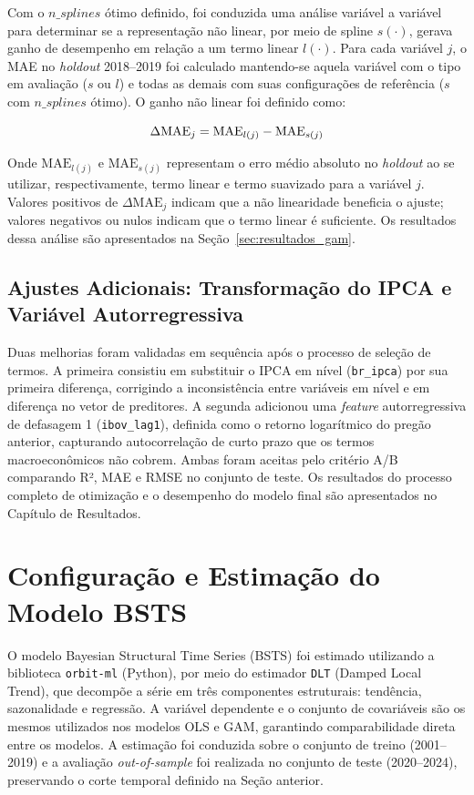 \documentclass[	12pt, Times, openright, oneside, a4paper, english, brazil]{abntex2}
\begin{document}
Com o $n\_splines$ ótimo definido, foi conduzida uma análise variável a variável para determinar se a representação não linear, por meio de spline $s(\cdot)$, gerava ganho de desempenho em relação a um termo linear $l(\cdot)$. Para cada variável $j$, o MAE no \textit{holdout} 2018--2019 foi calculado mantendo-se aquela variável com o tipo em avaliação ($s$ ou $l$) e todas as demais com suas configurações de referência ($s$ com $n\_splines$ ótimo). O ganho não linear foi definido como:

\begin{equation}\hfill
\Delta\text{MAE}_j = \text{MAE}_{l(j)} - \text{MAE}_{s(j)}
\label{eq:ganho_nao_linear}
\end{equation}

Onde $\text{MAE}_{l(j)}$ e $\text{MAE}_{s(j)}$ representam o erro médio absoluto no \textit{holdout} ao se utilizar, respectivamente, termo linear e termo suavizado para a variável $j$. Valores positivos de $\Delta\text{MAE}_j$ indicam que a não linearidade beneficia o ajuste; valores negativos ou nulos indicam que o termo linear é suficiente. Os resultados dessa análise são apresentados na Seção~\ref{sec:resultados_gam}.

\subsection{Ajustes Adicionais: Transformação do IPCA e Variável Autorregressiva}

Duas melhorias foram validadas em sequência após o processo de seleção de termos. A primeira consistiu em substituir o IPCA em nível (\texttt{br\_ipca}) por sua primeira diferença, corrigindo a inconsistência entre variáveis em nível e em diferença no vetor de preditores. A segunda adicionou uma \textit{feature} autorregressiva de defasagem 1 (\texttt{ibov\_lag1}), definida como o retorno logarítmico do pregão anterior, capturando autocorrelação de curto prazo que os termos macroeconômicos não cobrem. Ambas foram aceitas pelo critério A/B comparando R², MAE e RMSE no conjunto de teste. Os resultados do processo completo de otimização e o desempenho do modelo final são apresentados no Capítulo de Resultados.

\section{Configuração e Estimação do Modelo BSTS}\label{sec:bsts_otimizacao}

O modelo Bayesian Structural Time Series (BSTS) foi estimado utilizando a biblioteca \texttt{orbit-ml} (Python), por meio do estimador \texttt{DLT} (Damped Local Trend), que decompõe a série em três componentes estruturais: tendência, sazonalidade e regressão. A variável dependente e o conjunto de covariáveis são os mesmos utilizados nos modelos OLS e GAM, garantindo comparabilidade direta entre os modelos. A estimação foi conduzida sobre o conjunto de treino (2001--2019) e a avaliação \textit{out-of-sample} foi realizada no conjunto de teste (2020--2024), preservando o corte temporal definido na Seção anterior.
\end{document}
